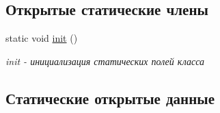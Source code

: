 \subsection*{Открытые статические члены}
\begin{DoxyCompactItemize}
\item 
\hypertarget{classboard_aeb1b89f64f70999d79b8d2c1a26a9fa4}{}static void \hyperlink{classboard_aeb1b89f64f70999d79b8d2c1a26a9fa4}{init} ()\label{classboard_aeb1b89f64f70999d79b8d2c1a26a9fa4}

\begin{DoxyCompactList}\small\item\em init -\/ инициализация статических полей класса \end{DoxyCompactList}\end{DoxyCompactItemize}
\subsection*{Статические открытые данные}

